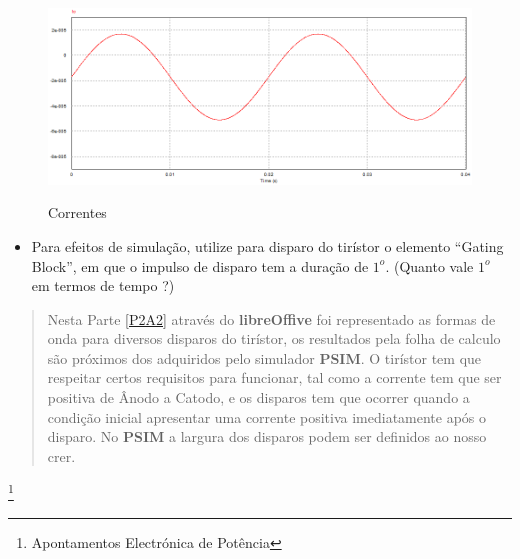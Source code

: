 \documentclass[titlepage, a4paper, 11pt, reqno, openany]{report}
\begin{document}
\begin{enumerate}
\begin{figure}[H]
\centering
\includegraphics[width=0.90\linewidth]{./image/P2A2p3d_2.png}\\
\caption{Correntes}
\label{grafico 26}
\end{figure}\par
%
\end{enumerate}
%
\begin{itemize}
\item 
Para efeitos de simula\c{c}\~{a}o, utilize para disparo do tir\'{i}stor o elemento “Gating Block”, em que o impulso de disparo tem a dura\c{c}\~{a}o  de $1^o$. (Quanto vale $1^o$ em termos de tempo ?)\par
% 
\end{itemize}
%
\begin{abstract}
%
Nesta Parte \ref{P2A2} atrav\'{e}s do {\bf libreOffive} foi representado as formas de onda para diversos disparos do tir\'{i}stor, os resultados pela folha de calculo são pr\'{o}ximos dos adquiridos pelo simulador {\bf PSIM}.
O tir\'{i}stor tem que respeitar certos requisitos para funcionar, tal como a corrente tem que ser positiva de \^{A}nodo a Catodo, e os disparos tem que ocorrer quando a condi\c{c}\~{a}o inicial apresentar uma corrente positiva imediatamente ap\'{o}s o disparo.
No {\bf PSIM} a largura dos disparos podem ser definidos ao nosso crer.
%
\end{abstract}
%
%

%
\newpage
\listoffigures
\cite{*}

\newpage
\footnote{Apontamentos Electr\'{o}nica de Pot\^{e}ncia}
%
\end{document}
